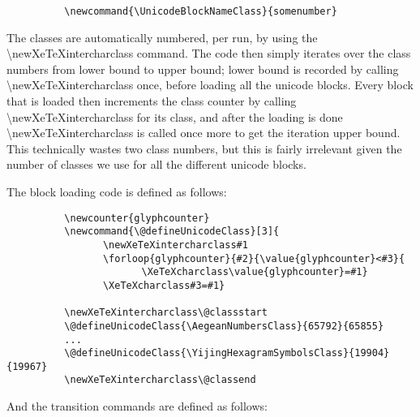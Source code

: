 \documentclass{article}
\begin{document}
		\disableTransitionRules
		\begin{verbatim}
　　　　　　\newcommand{\UnicodeBlockNameClass}{somenumber}
		\end{verbatim}
		\enableTransitionRules
		
		The classes are automatically numbered, per run, by using the \textbackslash newXeTeXintercharclass command. The code then simply iterates over the class numbers from lower bound to upper bound; lower bound is recorded by calling \textbackslash newXeTeXintercharclass once, before loading all the unicode blocks. Every block that is loaded then increments the class counter by calling \textbackslash newXeTeXintercharclass for its class, and after the loading is done \textbackslash newXeTeXintercharclass is called once more to get the iteration upper bound. This technically wastes two class numbers, but this is fairly irrelevant given the number of classes we use for all the different unicode blocks.
		
		The block loading code is defined as follows:
		
		\disableTransitionRules
		\begin{verbatim}
　　　　　　\newcounter{glyphcounter}
　　　　　　\newcommand{\@defineUnicodeClass}[3]{
　　　　　　　　　　\newXeTeXintercharclass#1
　　　　　　　　　　\forloop{glyphcounter}{#2}{\value{glyphcounter}<#3}{
　　　　　　　　　　　　　　\XeTeXcharclass\value{glyphcounter}=#1}
　　　　　　　　　　\XeTeXcharclass#3=#1}		

　　　　　　\newXeTeXintercharclass\@classstart
　　　　　　\@defineUnicodeClass{\AegeanNumbersClass}{65792}{65855}
　　　　　　...
　　　　　　\@defineUnicodeClass{\YijingHexagramSymbolsClass}{19904}{19967}
　　　　　　\newXeTeXintercharclass\@classend
		\end{verbatim}
		\enableTransitionRules

		And the transition commands are defined as follows:
\end{document}
